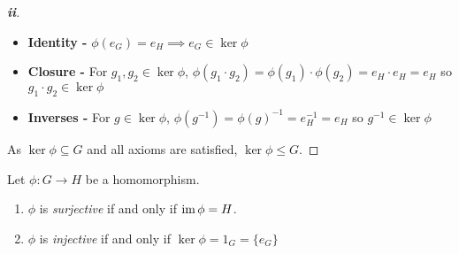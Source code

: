 \documentclass[../main.tex]{subfiles}
\begin{document}
\begin{proof}[\textbf{ii}]
  \begin{itemize}
    \item \textbf{Identity -} $\phi(e_G) = e_H \implies e_G \in \ker \phi$
    \item \textbf{Closure -} For $g_1, g_2 \in \ker \phi$, $\phi(g_1 \cdot g_2) = \phi(g_1) \cdot \phi(g_2) = e_H \cdot e_H = e_H$ so $g_1 \cdot g_2 \in \ker \phi$
    \item \textbf{Inverses -} For $g \in \ker \phi$, $\phi(g^{-1}) = \phi(g)^{-1} = e^{-1}_{H} = e_H$ so $g^{-1} \in \ker \phi$
  \end{itemize}
  As $\ker \phi \subseteq G$ and all axioms are satisfied, $\ker \phi \leq G$.
\end{proof}
\begin{remark}
  Let $\phi: G \to H$ be a homomorphism.
  \begin{enumerate}
    \item $\phi$ is \textit{surjective} if and only if $\operatorname{im} \phi = H$.
    \item $\phi$ is \textit{injective} if and only if $\ker \phi = 1_G = \{e_G\}$
  \end{enumerate}
\end{remark}
\end{document}
